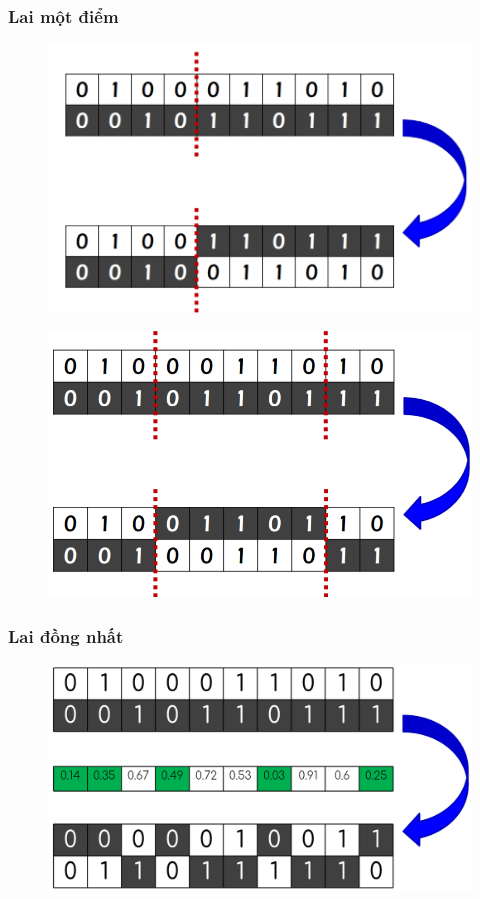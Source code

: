 \documentclass{book}
\begin{document}
\subsubsection{Lai một điểm}
\begin{figure}[H]
    \centering
    \includegraphics[width=0.75\linewidth]{images/laimotdiem1.png}
\end{figure}

\begin{figure}[H]
    \centering
    \includegraphics[width=0.75\linewidth]{images/laimotdiem2.png}
\end{figure}

\subsubsection{Lai đồng nhất}
\begin{figure}[H]
    \centering
    \includegraphics[width=0.75\linewidth]{images/laidongnhat.png}
\end{figure}
\end{document}
